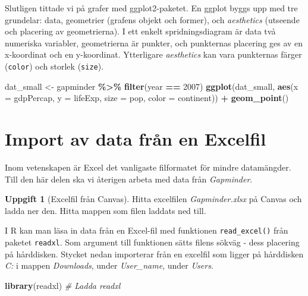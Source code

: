 \documentclass[
]{book}
\newenvironment{Shaded}{\begin{snugshade}}{\end{snugshade}}
\newcommand{\AttributeTok}[1]{\textcolor[rgb]{0.13,0.29,0.53}{#1}}
\newcommand{\CommentTok}[1]{\textcolor[rgb]{0.56,0.35,0.01}{\textit{#1}}}
\newcommand{\DecValTok}[1]{\textcolor[rgb]{0.00,0.00,0.81}{#1}}
\newcommand{\FunctionTok}[1]{\textcolor[rgb]{0.13,0.29,0.53}{\textbf{#1}}}
\newcommand{\NormalTok}[1]{#1}
\newcommand{\OtherTok}[1]{\textcolor[rgb]{0.56,0.35,0.01}{#1}}
\newcommand{\SpecialCharTok}[1]{\textcolor[rgb]{0.81,0.36,0.00}{\textbf{#1}}}
\theoremstyle{definition}
\theoremstyle{definition}
\theoremstyle{definition}
\newtheorem{exercise}{Uppgift}[chapter]
\theoremstyle{definition}
\theoremstyle{remark}
\begin{document}
Slutligen tittade vi på grafer med ggplot2-paketet. En ggplot byggs upp med tre grundelar: data, geometrier (grafens objekt och former), och \emph{aesthetics} (utseende och placering av geometrierna). I ett enkelt spridningsdiagram är data två numeriska variabler, geometrierna är punkter, och punkternas placering ges av en x-koordinat och en y-koordinat. Ytterligare \emph{aesthetics} kan vara punkternas färger (\texttt{color}) och storlek (\texttt{size}).

\begin{Shaded}
\begin{Highlighting}[]
\NormalTok{dat\_small }\OtherTok{\textless{}{-}}\NormalTok{ gapminder }\SpecialCharTok{\%\textgreater{}\%} \FunctionTok{filter}\NormalTok{(year }\SpecialCharTok{==} \DecValTok{2007}\NormalTok{)}
\FunctionTok{ggplot}\NormalTok{(dat\_small, }\FunctionTok{aes}\NormalTok{(}\AttributeTok{x =}\NormalTok{ gdpPercap, }\AttributeTok{y =}\NormalTok{ lifeExp, }
                      \AttributeTok{size =}\NormalTok{ pop, }\AttributeTok{color =}\NormalTok{ continent)) }\SpecialCharTok{+}
  \FunctionTok{geom\_point}\NormalTok{()}
\end{Highlighting}
\end{Shaded}

\section{Import av data från en Excelfil}\label{import-av-data-fruxe5n-en-excelfil}

Inom vetenskapen är Excel det vanligaste filformatet för mindre datamängder. Till den här delen ska vi återigen arbeta med data från \emph{Gapminder}.

\begin{exercise}[Excelfil från Canvas]
Hitta excelfilen \emph{Gapminder.xlsx} på Canvas och ladda ner den. Hitta mappen som filen laddats ned till.
\end{exercise}

I R kan man läsa in data från en Excel-fil med funktionen \texttt{read\_excel()} från paketet \texttt{readxl}. Som argument till funktionen sätts filens sökväg - dess placering på hårddisken. Stycket nedan importerar från en excelfil som ligger på hårddisken \emph{C:} i mappen \emph{Downloads}, under \emph{User\_name}, under \emph{Users}.

\begin{Shaded}
\begin{Highlighting}[]
\FunctionTok{library}\NormalTok{(readxl)  }\CommentTok{\# Ladda readxl}
\end{Highlighting}
\end{Shaded}
\end{document}
